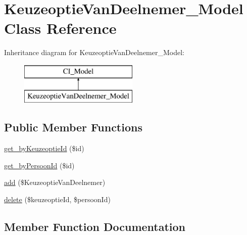\hypertarget{class_keuzeoptie_van_deelnemer___model}{}\section{Keuzeoptie\+Van\+Deelnemer\+\_\+\+Model Class Reference}
\label{class_keuzeoptie_van_deelnemer___model}
Inheritance diagram for Keuzeoptie\+Van\+Deelnemer\+\_\+\+Model\+:\begin{figure}[H]
\begin{center}
\leavevmode
\includegraphics[height=2.000000cm]{class_keuzeoptie_van_deelnemer___model}
\end{center}
\end{figure}
\subsection*{Public Member Functions}
\begin{DoxyCompactItemize}
\item 
\mbox{\hyperlink{class_keuzeoptie_van_deelnemer___model_a2c5a659c1a9ac27412da831c77dc6278}{get\+\_\+by\+Keuzeoptie\+Id}} (\$id)
\item 
\mbox{\hyperlink{class_keuzeoptie_van_deelnemer___model_a24cf82d6b80c9d3429c1ad3d0b062cf3}{get\+\_\+by\+Persoon\+Id}} (\$id)
\item 
\mbox{\hyperlink{class_keuzeoptie_van_deelnemer___model_a0927ce812ee8eba5b7a14c26da4298c5}{add}} (\$Keuzeoptie\+Van\+Deelnemer)
\item 
\mbox{\hyperlink{class_keuzeoptie_van_deelnemer___model_a38b7d67f29df2635e56409713823e579}{delete}} (\$keuzeoptie\+Id, \$persoon\+Id)
\end{DoxyCompactItemize}


\subsection{Member Function Documentation}
\mbox{\label{class_keuzeoptie_van_deelnemer___model_a0927ce812ee8eba5b7a14c26da4298c5}} 
